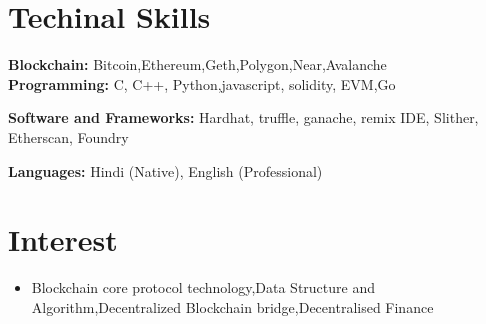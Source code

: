 \documentclass[letterpaper,11pt]{article}
\makeatletter
\newcommand{\resumeItem}[1]{
  \item\small{
    {#1 \vspace{-2pt}}
  }
}
\newcommand{\resumeOrganizationHeading}[4]{
  \vspace{-2pt}\item
    \begin{tabular*}{0.97\textwidth}[t]{l@{\extracolsep{\fill}}r}
      \textbf{#1} & \textit{\small #2} \\
      \textit{\small#3}
    \end{tabular*}\vspace{-7pt}
}
\newcommand{\resumeSubHeadingListStart}{\begin{itemize}[leftmargin=0.15in, label={}]}
\newcommand{\resumeSubHeadingListEnd}{\end{itemize}}
\newcommand{\resumeItemListStart}{\begin{itemize}}
\newcommand{\resumeItemListEnd}{\end{itemize}\vspace{-5pt}}
\makeatother
\begin{document}
\section{Techinal Skills}
  \vspace{2pt}
  \resumeSubHeadingListStart
    \small{\item{
        \textbf{Blockchain:}{ Bitcoin,Ethereum,Geth,Polygon,Near,Avalanche} \\ \vspace{3pt}
        \textbf{Programming:}{ C, C++, Python,javascript, solidity, EVM,Go } \\ \vspace{3pt}

        \textbf{Software and Frameworks:}{ Hardhat, truffle, ganache, 
remix IDE, Slither, Etherscan, Foundry } \\ \vspace{3pt}
        
        
        
        \textbf{Languages:}{ Hindi (Native), English (Professional)}
        
    }}
  \resumeSubHeadingListEnd







\section{Interest}
  \resumeSubHeadingListStart
  \resumeItemListStart
     \resumeItem{Blockchain core protocol technology,Data Structure and Algorithm,Decentralized Blockchain bridge,Decentralised Finance}


     \resumeItemListEnd
     \resumeSubHeadingListEnd
     

    
    
\end{document}
